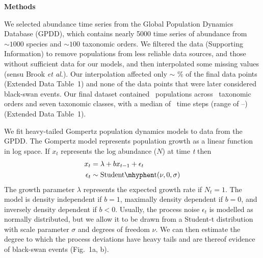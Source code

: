 \clearpage

\textbf{Methods}

We selected abundance time series from the Global Population Dynamics Database\cite{gpdd2010} (GPDD), which contains nearly 5000 time series of abundance from \(\sim 1000\) species and \(\sim 100\) taxonomic orders. We filtered the data (Supporting Information) to remove populations from less reliable data sources, and those without sufficient data for our models, and then interpolated some missing values (sensu Brook \textit{et al.}\cite{brook2006a}). Our interpolation affected only \(\sim\) \interpPointsPerc \% of the final data points (Extended Data Table~1) and none of the data points that were later considered black-swan events. Our final dataset contained \NPops\ populations across \NOrders\ taxonomic orders and seven taxonomic classes, with a median of \medianTimeSteps\ time steps (range of \minTimeSteps--\maxTimeSteps) (Extended Data Table~1).

We fit heavy-tailed Gompertz population dynamics models to data from the GPDD. The Gompertz model represents population growth as a linear function in log space. If \(x_{t}\) represents the log abundance (\(N\)) at time \emph{t} then
\begin{align}
x_t &= \lambda + bx_{t - 1} + \epsilon_t\\
\epsilon_t &\sim \mathrm{Student\mhyphen t}(\nu, 0, \sigma)
\end{align}
The growth parameter \(\lambda\) represents the expected growth rate if \(N_{t} = 1\). The model is density independent if \(b = 1\), maximally density dependent if \(b = 0\), and inversely density dependent if \(b < 0\). Usually, the process noise \(\epsilon_{t}\) is modelled as normally distributed, but we allow it to be drawn from a Student-t distribution with scale parameter \(\sigma\) and degrees of freedom \(\nu\). We can then estimate the degree to which the process deviations have heavy tails and are thereof evidence of black-swan events (Fig.~1a, b).

